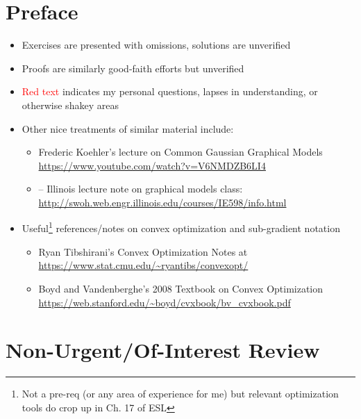 \documentclass[11pt]{article}
\begin{document}
\section*{Preface}

\begin{itemize}
    \item Exercises are presented with omissions, solutions are unverified 
    \item Proofs are similarly good-faith efforts but unverified 
    \item \textcolor{red}{Red text} indicates my personal questions, lapses in understanding, or otherwise shakey areas 
    \item Other nice treatments of similar material include:
    \begin{itemize}
            \item Frederic Koehler's lecture on Common Gaussian Graphical Models \url{https://www.youtube.com/watch?v=V6NMDZB6LI4}
        	\item -- Illinois lecture note on graphical models class: \url{http://swoh.web.engr.illinois.edu/courses/IE598/info.html}
    \end{itemize}
    \item Useful\footnote{Not a pre-req (or any area of experience for me) but relevant optimization tools do crop up in Ch. 17 of ESL} references/notes on convex optimization and sub-gradient notation 
    \begin{itemize}
            \item Ryan Tibshirani's Convex Optimization Notes at \url{https://www.stat.cmu.edu/~ryantibs/convexopt/}
            \item Boyd and Vandenberghe's 2008 Textbook on Convex Optimization \url{https://web.stanford.edu/~boyd/cvxbook/bv_cvxbook.pdf}
    \end{itemize}
\end{itemize}

\section*{Non-Urgent/Of-Interest Review}
\end{document}
